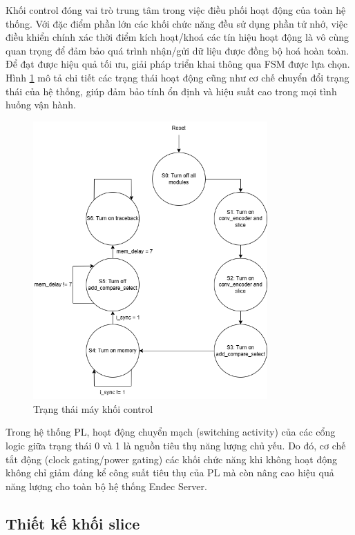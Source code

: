 \documentclass[../DoAn.tex]{subfiles}
\begin{document}
Khối control đóng vai trò trung tâm trong việc điều phối hoạt động của toàn hệ thống. Với đặc điểm phần lớn các khối chức năng đều sử dụng phần tử nhớ, việc điều khiển chính xác thời điểm kích hoạt/khoá các tín hiệu hoạt động là vô cùng quan trọng để đảm bảo quá trình nhận/gửi dữ liệu được đồng bộ hoá hoàn toàn. Để đạt được hiệu quả tối ưu, giải pháp triển khai thông qua FSM được lựa chọn. Hình \ref{fig:Trạng thái máy khối control} mô tả chi tiết các trạng thái hoạt động cũng như cơ chế chuyển đổi trạng thái của hệ thống, giúp đảm bảo tính ổn định và hiệu suất cao trong mọi tình huống vận hành.

\begin{figure}[H]
    \centering
    \includegraphics[width=0.8\textwidth, height=0.3\textheight, keepaspectratio]{Hinhve/Chuong 4/control state.png}
    \caption{Trạng thái máy khối control}
    \label{fig:Trạng thái máy khối control}
\end{figure}

Trong hệ thống PL, hoạt động chuyển mạch (switching activity) của các cổng logic giữa trạng thái 0 và 1 là nguồn tiêu thụ năng lượng chủ yếu. Do đó, cơ chế tắt động (clock gating/power gating) các khối chức năng khi không hoạt động không chỉ giảm đáng kể công suất tiêu thụ của PL mà còn nâng cao hiệu quả năng lượng cho toàn bộ hệ thống Endec Server. 

\subsection{Thiết kế khối slice}
\end{document}
